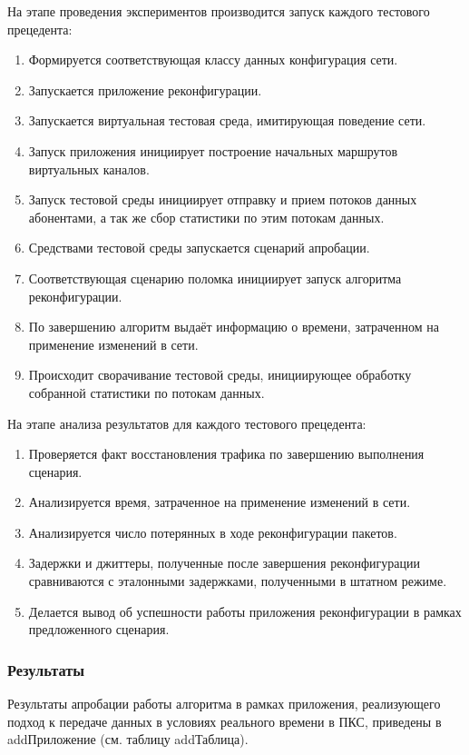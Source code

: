 \documentclass[12pt, a4paper]{article}
\begin{document}
На этапе проведения экспериментов производится запуск каждого тестового прецедента:
\begin{enumerate}
	\item Формируется соответствующая классу данных конфигурация сети.
	\item Запускается приложение реконфигурации.
	\item Запускается виртуальная тестовая среда, имитирующая поведение сети.
	\item Запуск приложения инициирует построение начальных маршрутов виртуальных каналов.
	\item Запуск тестовой среды инициирует отправку и прием потоков данных абонентами, а так же сбор статистики по этим потокам данных.
	\item Средствами тестовой среды запускается сценарий апробации.
	\item Соответствующая сценарию поломка инициирует запуск алгоритма реконфигурации.
	\item По завершению алгоритм выдаёт информацию о времени, затраченном на применение изменений в сети.
	\item Происходит сворачивание тестовой среды, инициирующее обработку собранной статистики по потокам данных.
\end{enumerate}

На этапе анализа результатов для каждого тестового прецедента:
\begin{enumerate}
	\item Проверяется факт восстановления трафика по завершению выполнения сценария.
	\item Анализируется время, затраченное на применение изменений в сети.
	\item Анализируется число потерянных в ходе реконфигурации пакетов.
	\item Задержки и джиттеры, полученные после завершения реконфигурации сравниваются с эталонными задержками, полученными в штатном режиме.
	\item Делается вывод об успешности работы приложения реконфигурации в рамках предложенного сценария.
\end{enumerate}

\subsubsection{Результаты}

Результаты апробации работы алгоритма в рамках приложения, реализующего подход к передаче данных в условиях реального времени в ПКС, приведены в addПриложение (см. таблицу addТаблица).
\end{document}
